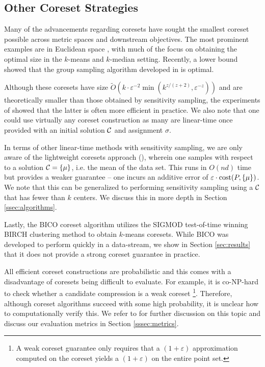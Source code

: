 

\subsection{Other Coreset Strategies}
\label{ssec:clustering_prelim}

Many of the advancements regarding coresets have sought the smallest coreset possible across metric spaces and downstream objectives. The most prominent
examples are in Euclidean space \cite{BadoiuHI02, HaM04, Chen09, HuangV20, stoc22}, with much of the focus on obtaining the optimal size in the $k$-means and
$k$-median setting. Recently, a lower bound \cite{huangLB} showed that the group sampling algorithm developed in \cite{CSS21, stoc22} is optimal.

Although these coresets have size $\tilde{O}(k\cdot \varepsilon^{-2} \min(k^{z/(z+2)},\varepsilon^{-z}))$ \cite{CLSSS22} and are theoretically smaller than
those obtained by sensitivity sampling, the experiments of \cite{chrisESA} showed that the latter is often more efficient in practice. We also note that one
could use virtually any coreset construction as many are linear-time once provided with an initial solution $\mathcal C$ and assignment $\sigma$.

In terms of other linear-time methods with sensitivity sampling, we are only aware of the lightweight coresets approach (\cite{lightweight_coresets}), wherein one
samples with respect to a solution $\mathcal C=\{\mu\}$, i.e. the mean of the data set. This runs in $O(nd)$ time but provides a weaker guarantee -- one incurs an
additive error of $\varepsilon\cdot \operatorname{cost}(P,\{\mu\})$.  We note that this can be generalized to performing sensitivity sampling using a $\mathcal C$ that has fewer
than $k$ centers. We discuss this in more depth in Section \ref{ssec:algorithms}.

Lastly, the BICO coreset algorithm \cite{bico} utilizes the SIGMOD test-of-time winning BIRCH \cite{birch} clustering method to obtain $k$-means coresets. While
BICO was developed to perform quickly in a data-stream, we show in Section \ref{sec:results} that it does not provide a strong coreset guarantee in
practice.

All efficient coreset constructions are probabilistic and this comes with a disadvantage of coresets being difficult to evaluate. For example, it is co-NP-hard
to check whether a candidate compression is a weak coreset \cite{chrisESA}\footnote{A weak coreset guarantee only requires that a $(1+\varepsilon)$ approximation computed on
the coreset yields a $(1+\varepsilon)$ on the entire point set.}. Therefore, although coreset algorithms succeed with some high probability, it
is unclear how to computationally verify this. We refer to \cite{chrisESA} for further discussion on this topic and discuss our evaluation metrics in Section
\ref{sssec:metrics}.

